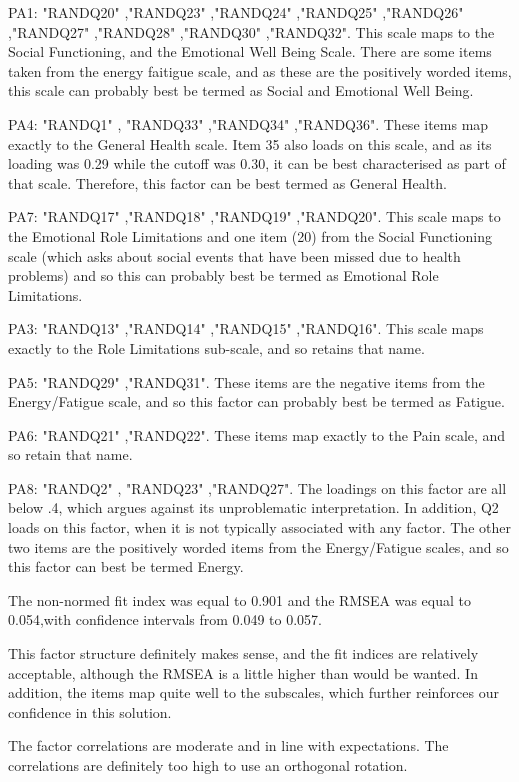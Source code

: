 \documentclass{article}
\begin{document}
PA1: "RANDQ20" ,"RANDQ23" ,"RANDQ24" ,"RANDQ25" ,"RANDQ26" ,"RANDQ27" ,"RANDQ28" ,"RANDQ30" ,"RANDQ32". This scale maps to the Social Functioning, and the Emotional Well Being Scale. There are some items taken from the energy faitigue scale, and as these are the positively worded items, this scale can probably best be termed as Social and Emotional Well Being. 

PA4: "RANDQ1" , "RANDQ33" ,"RANDQ34" ,"RANDQ36". These items map exactly to the General Health scale. Item 35 also loads on this scale, and as its loading was 0.29 while the cutoff was 0.30, it can be best characterised as part of that scale. Therefore, this factor can be best termed as General Health.

PA7: "RANDQ17" ,"RANDQ18" ,"RANDQ19" ,"RANDQ20". This scale maps to the Emotional Role Limitations and one item (20) from the Social Functioning scale (which asks about social events that have been missed due to health problems) and so this can probably best be termed as Emotional Role Limitations.

PA3: "RANDQ13" ,"RANDQ14" ,"RANDQ15" ,"RANDQ16". This scale maps exactly to the Role Limitations sub-scale, and so retains that name. 

PA5: "RANDQ29" ,"RANDQ31". These items are the negative items from the Energy/Fatigue scale, and so this factor can probably best be termed as Fatigue. 

PA6: "RANDQ21" ,"RANDQ22". These items map exactly to the Pain scale, and so retain that name. 

PA8: "RANDQ2" , "RANDQ23" ,"RANDQ27". The loadings on this factor are all below .4, which argues against its unproblematic interpretation. In addition, Q2 loads on this factor, when it is not typically associated with any factor. The other two items are the positively worded items from the  Energy/Fatigue scales, and so this factor can best be termed Energy. 



The non-normed fit index was equal to 0.901
and the RMSEA was equal to 0.054,with confidence intervals from 0.049 to 0.057.

This factor structure definitely makes sense, and the fit indices are relatively acceptable, although the RMSEA is a little higher than would be wanted. In addition, the items map quite well to the subscales, which further reinforces our confidence in this solution.



The factor correlations are moderate and in line with expectations. The correlations are definitely too high to use an orthogonal rotation. 
\end{document}
